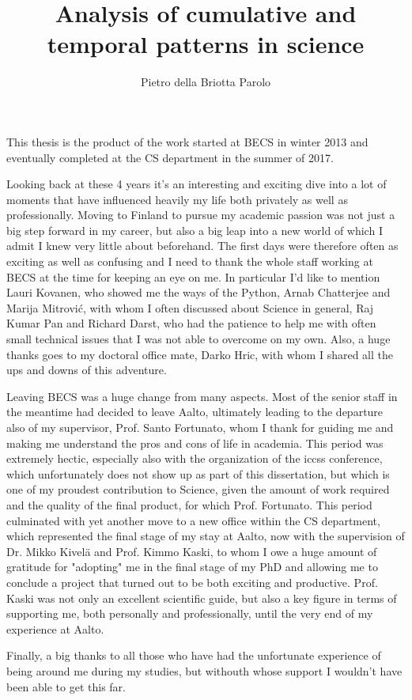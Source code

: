\documentclass[dissertation,math,vertlayout]{aaltoseries}
\author{Pietro della Briotta Parolo}
\title{Analysis of cumulative and temporal patterns in science}
\begin{document}
%



\begin{preface}[Espoo]

This thesis is the product of the work started at BECS in winter 2013 and eventually 
completed at the CS department in the summer of 2017. 

Looking back at these 4 years it's an interesting and exciting dive into
a lot of moments that have influenced heavily my life both privately as well as professionally.
Moving to Finland to pursue my academic passion was not just a big step forward in my career, but also
a big leap into a new world of which I admit I knew very little about beforehand. The first days were
therefore often as exciting as well as confusing and I need to thank the whole staff working at BECS
at the time for keeping an eye on me. In particular I'd like to mention Lauri Kovanen, who showed me 
the ways of the Python, Arnab Chatterjee and Marija Mitrovi\'c, with whom I often discussed about Science
in general, Raj Kumar Pan and Richard Darst, who had the patience to help me with often small
technical issues that I was not able to overcome on my own. Also, a huge thanks goes to my doctoral office mate, Darko Hric,
with whom I shared all the ups and downs of this adventure.

Leaving BECS was a huge change from many aspects. Most of the senior staff in the meantime had decided
to leave Aalto, ultimately leading to the departure also of my supervisor, Prof. Santo Fortunato,
whom I thank for guiding me and making me understand the pros and cons of life in academia. 
This period was extremely hectic, especially also with the organization of the iccss conference, which
unfortunately does not show up as part of this dissertation, but which is one of my proudest contribution
to Science, given the amount of work required and the quality of the final product, for which
Prof. Fortunato. This period culminated with yet another move to a new office within the CS department,
which represented the final stage of my stay at Aalto, now with the supervision
of Dr. Mikko Kivel\"a and Prof. Kimmo Kaski, to whom I owe a huge amount of gratitude
for "adopting" me in the final stage of my PhD and allowing me to conclude a project that turned out
to be both exciting and productive. Prof. Kaski was not only an excellent scientific
guide, but also a key figure in terms of supporting me, both personally and professionally,
until the very end of my experience at Aalto.

Finally, a big thanks to all those who have had the unfortunate experience
of being around me during my studies, but withouth whose support I wouldn't have been
able to get this far. 



\end{preface}
\end{document}
